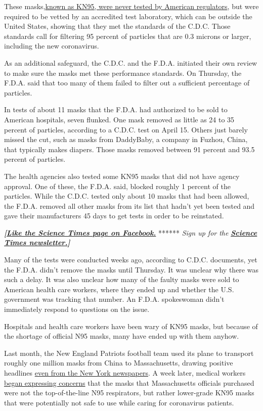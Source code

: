 These
masks,\href{https://www.nytimes3xbfgragh.onion/2020/04/03/health/coronavirus-n95-kn95-masks.html}{known
as KN95, were never tested by American regulators}, but were required to
be vetted by an accredited test laboratory, which can be outside the
United States, showing that they met the standards of the C.D.C. Those
standards call for filtering 95 percent of particles that are 0.3
microns or larger, including the new coronavirus.

As an additional safeguard, the C.D.C. and the F.D.A. initiated their
own review to make sure the masks met these performance standards. On
Thursday, the F.D.A. said that too many of them failed to filter out a
sufficient percentage of particles.

In tests of about 11 masks that the F.D.A. had authorized to be sold to
American hospitals, seven flunked. One mask removed as little as 24 to
35 percent of particles, according to a C.D.C. test on April 15. Others
just barely missed the cut, such as masks from DaddyBaby, a company in
Fuzhou, China, that typically makes diapers. Those masks removed between
91 percent and 93.5 percent of particles.

The health agencies also tested some KN95 masks that did not have agency
approval. One of these, the F.D.A. said, blocked roughly 1 percent of
the particles. While the C.D.C. tested only about 10 masks that had been
allowed, the F.D.A. removed all other masks from its list that hadn't
yet been tested and gave their manufacturers 45 days to get tests in
order to be reinstated.

\textbf{\emph{{[}}\href{http://on.fb.me/1paTQ1h}{\emph{Like the Science
Times page on Facebook.}}} ****** \emph{\textbar{} Sign up for the}
\textbf{\href{http://nyti.ms/1MbHaRU}{\emph{Science Times
newsletter.}}\emph{{]}}}

Many of the tests were conducted weeks ago, according to C.D.C.
documents, yet the F.D.A. didn't remove the masks until Thursday. It was
unclear why there was such a delay. It was also unclear how many of the
faulty masks were sold to American health care workers, where they ended
up and whether the U.S. government was tracking that number. An F.D.A.
spokeswoman didn't immediately respond to questions on the issue.

Hospitals and health care workers have been wary of KN95 masks, but
because of the shortage of official N95 masks, many have ended up with
them anyhow.

Last month, the New England Patriots football team used its plane to
transport roughly one million masks from China to Massachusetts, drawing
positive headlines
\href{https://www.bostonherald.com/2020/04/05/pigs-take-flight-new-york-hearts-new-england-patriots/}{even
from the New York newspapers}. A week later, medical workers
\href{https://www.bostonglobe.com/2020/04/12/metro/medical-workers-share-concerns-about-masks-delivered-by-patriots-plane/}{began
expressing concerns} that the masks that Massachusetts officials
purchased were not the top-of-the-line N95 respirators, but rather
lower-grade KN95 masks that were potentially not safe to use while
caring for coronavirus patients.

